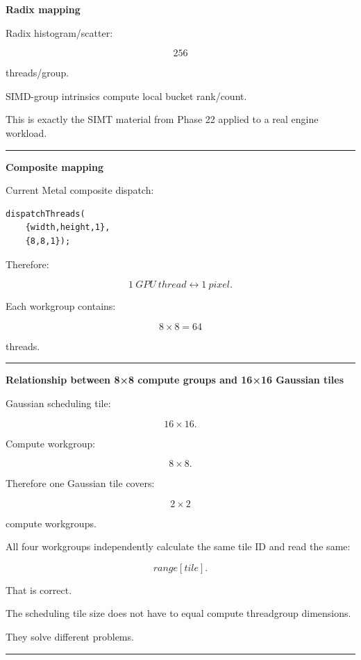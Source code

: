 \textbf{Radix mapping}

Radix histogram/scatter:

\[
256
\]

threads/group.

SIMD-group intrinsics compute local bucket rank/count.

This is exactly the SIMT material from Phase 22 applied to a real engine workload.

\begin{center}\rule{0.5\linewidth}{0.5pt}\end{center}

\textbf{Composite mapping}

Current Metal composite dispatch:

\begin{verbatim}
dispatchThreads(
    {width,height,1},
    {8,8,1});
\end{verbatim}

Therefore:

\[
\boxed{
1\ GPU\ thread
\leftrightarrow
1\ pixel.
}
\]

Each workgroup contains:

\[
8\times8=64
\]

threads.

\begin{center}\rule{0.5\linewidth}{0.5pt}\end{center}

\textbf{Relationship between 8×8 compute groups and 16×16 Gaussian tiles}

Gaussian scheduling tile:

\[
16\times16.
\]

Compute workgroup:

\[
8\times8.
\]

Therefore one Gaussian tile covers:

\[
2\times2
\]

compute workgroups.

All four workgroups independently calculate the same tile ID and read the same:

\[
range[tile].
\]

That is correct.

The scheduling tile size does not have to equal compute threadgroup dimensions.

They solve different problems.

\begin{center}\rule{0.5\linewidth}{0.5pt}\end{center}


